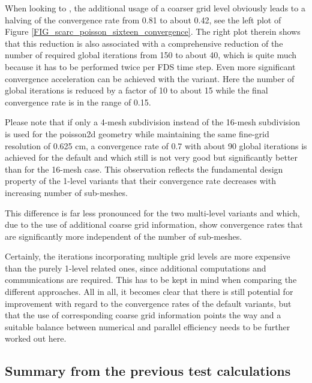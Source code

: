 When looking to \scarctwolevel{}, the additional usage of a coarser grid level obviously leads to a halving of the convergence rate from 0.81 to about 0.42, see the left plot of Figure \ref{FIG_scarc_poisson_sixteen_convergence}. The right plot therein shows that this reduction is also associated with a comprehensive  reduction of the number of required global \scarc{} iterations from 150 to about 40, which is quite much because it has to be performed twice per FDS time step.  
Even more significant convergence acceleration can be achieved with the \scarcmultigrid{} variant. Here the number of global \scarc{} iterations is reduced by a factor of 10 to about 15 while the final convergence rate is in the range of 0.15.

Please note that if only a 4-mesh subdivision instead of the 16-mesh subdivision is used for the {\ct poisson2d} geometry while maintaining the same fine-grid resolution of 0.625 cm, a convergence rate of 0.7 with about 90 global iterations is achieved for the default \scarc{} and \uscarc{} which still is not very good but significantly better than for the 16-mesh case. This observation reflects the fundamental design property of the 1-level variants that their convergence rate decreases with increasing number of sub-meshes.

This difference is far less pronounced for the two multi-level variants \scarctwolevel{} and \scarcmultigrid{} 
which, due to the use of additional coarse grid information, show convergence rates that are significantly more independent of the number of sub-meshes.

Certainly, the \scarc{} iterations incorporating multiple grid levels are more expensive than the purely 1-level related ones, since additional computations and communications are required. This has to be kept in mind when comparing the different approaches.
All in all, it becomes clear that there is still potential for improvement with regard to the convergence rates of the default \scarc{} variants, but that the use of corresponding coarse grid information points the way and a suitable balance between numerical and parallel efficiency needs to be further worked out here.

\subsection{Summary from the previous test calculations}
\label{SEC_SCARC_poisson_evaluation}

